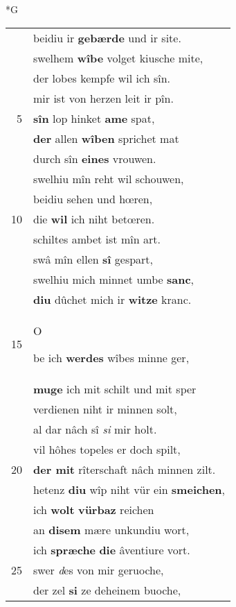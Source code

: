 \documentclass[8pt,a4paper,notitlepage]{article}
\begin{document}
\newpage
\begin{table}[ht]
\begin{minipage}[t]{0.5\linewidth}
\small
\begin{center}*G
\end{center}
\begin{tabular}{rl}
 & beidiu ir \textbf{gebærde} und ir site.\\ 
 & swelhem \textbf{wîbe} volget kiusche mite,\\ 
 & der lobes kempfe wil ich sîn.\\ 
 & mir ist von herzen leit ir pîn.\\ 
5 & \textbf{sîn} lop hinket \textbf{ame} spat,\\ 
 & \textbf{der} allen \textbf{wîben} sprichet mat\\ 
 & durch sîn \textbf{eines} vrouwen.\\ 
 & swelhiu mîn reht wil schouwen,\\ 
 & beidiu sehen und hœren,\\ 
10 & die \textbf{wil} ich niht betœren.\\ 
 & schiltes ambet ist mîn art.\\ 
 & swâ mîn ellen \textbf{sî} gespart,\\ 
 & swelhiu mich minnet umbe \textbf{sanc},\\ 
 & \textbf{diu} dûchet mich ir \textbf{witze} kranc.\\ 
15 & \begin{large}O\end{large}be ich \textbf{werdes} wîbes minne ger,\\ 
 & \textbf{muge} ich mit schilt und mit sper\\ 
 & verdienen niht ir minnen solt,\\ 
 & al dar nâch sî \textit{si} mir holt.\\ 
 & vil hôhes topeles er doch spilt,\\ 
20 & \textbf{der mit} rîterschaft nâch minnen zilt.\\ 
 & hetenz \textbf{diu} wîp niht vür ein \textbf{smeichen},\\ 
 & ich \textbf{wolt} \textbf{vürbaz} reichen\\ 
 & an \textbf{disem} mære unkundiu wort,\\ 
 & ich \textbf{spræche} \textbf{die} âventiure vort.\\ 
25 & swer \textit{d}es von mir geruoche,\\ 
 & der zel \textbf{si} ze deheinem buoche,\\ 

\end{tabular}
\end{minipage}
\end{table}
\end{document}

